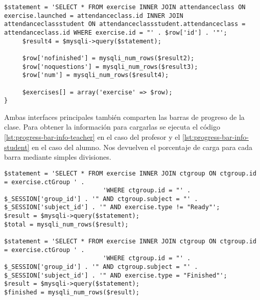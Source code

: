 \begin{lstlisting}[caption=Cargar los ejercicios del tipo pasado por parámetro.,label={lst:carga-ejercicios}]
     $statement = 'SELECT * FROM exercise INNER JOIN attendanceclass ON exercise.launched = attendanceclass.id INNER JOIN attendanceclassstudent ON attendanceclassstudent.attendanceclass = attendanceclass.id WHERE exercise.id = "' . $row['id'] . '"';
     $result4 = $mysqli->query($statement);
               
     $row['nofinished'] = mysqli_num_rows($result2);
     $row['noquestions'] = mysqli_num_rows($result3);
     $row['num'] = mysqli_num_rows($result4);
                
     $exercises[] = array('exercise' => $row);
}
\end{lstlisting}

Ambas interfaces principales también comparten las barras de progreso de la clase. Para obtener la información para cargarlas se ejecuta el código \ref{lst:progress-bar-info-teacher} en el caso del profesor y el \ref{lst:progress-bar-info-student} en el caso del alumno. Nos devuelven el porcentaje de carga para cada barra mediante simples divisiones.\\

\noindent
\begin{lstlisting}[caption=Obtener información para la carga de la barra de progreso del profesor.,label={lst:progress-bar-info-teacher}]
$statement = 'SELECT * FROM exercise INNER JOIN ctgroup ON ctgroup.id = exercise.ctGroup ' .
                           'WHERE ctgroup.id = "' . $_SESSION['group_id'] . '" AND ctgroup.subject = "' . $_SESSION['subject_id'] . '" AND exercise.type != "Ready"';
$result = $mysqli->query($statement);
$total = mysqli_num_rows($result);

$statement = 'SELECT * FROM exercise INNER JOIN ctgroup ON ctgroup.id = exercise.ctGroup ' .
                           'WHERE ctgroup.id = "' . $_SESSION['group_id'] . '" AND ctgroup.subject = "' . $_SESSION['subject_id'] . '" AND exercise.type = "Finished"';
$result = $mysqli->query($statement);
$finished = mysqli_num_rows($result);
\end{lstlisting}

